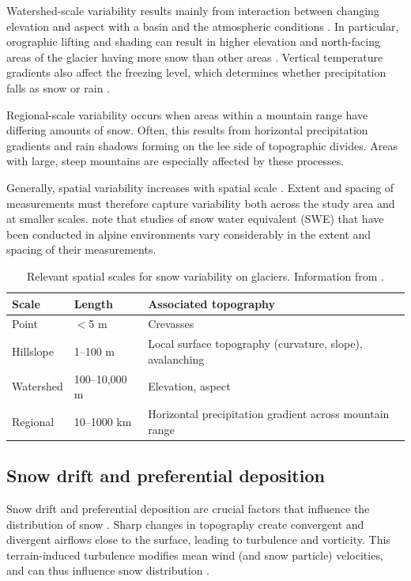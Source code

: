 \documentclass{sfuthesis}
\begin{document}
Watershed-scale variability results mainly from interaction between changing elevation and aspect with a basin and the atmospheric conditions \citep{Clark2011}. In particular, orographic lifting and shading can result in higher elevation and north-facing areas of the glacier having more snow than other areas \citep{Mott2008, Sold2013}. {\color{red} Vertical temperature gradients} also affect the freezing level, which determines whether precipitation falls as snow or rain \citep{Bloschl1991}. 

Regional-scale variability occurs when areas within a mountain range have differing amounts of snow. Often, this results from horizontal precipitation gradients and rain shadows forming on the lee side of topographic divides. Areas with large, steep mountains are especially affected by these processes.

Generally, spatial variability increases with spatial scale \citep{Clark2011}. Extent and spacing of measurements must therefore capture variability both across the study area and at smaller scales. \cite{Clark2011} note that studies of snow water equivalent (SWE) that have been conducted in alpine environments vary considerably in the extent and spacing of their measurements. 

\begin{table}
\centering
\caption[Relevant spatial scales for snow variability on glaciers]{ Relevant spatial scales for snow variability on glaciers. Information from \cite{Clark2011}.}
\label{scale}
\begin{tabular}{lll}
\textbf{Scale} & \textbf{Length} & \textbf{Associated topography}                     \\ \hline
Point          & $<$5 m         & Crevasses                                               \\
Hillslope      & 1--100 m        & Local surface topography (curvature, slope), avalanching        \\
Watershed      & 100--10,000 m   & Elevation, aspect                                       \\
Regional       & 10--1000 km     & Horizontal precipitation gradient across mountain range
\end{tabular}
\end{table}

\subsection{Snow drift and preferential deposition}
Snow drift and preferential deposition are crucial factors that influence the distribution of snow \citep{Lehning2008, Winstral2002, Clark2011}. Sharp changes in topography create convergent and divergent airflows close to the surface, leading to turbulence and vorticity. This terrain-induced turbulence modifies mean wind (and snow particle) velocities, and can thus influence snow distribution \citep{Mott2008, Lehning2008, Dadic2010}.
\end{document}
